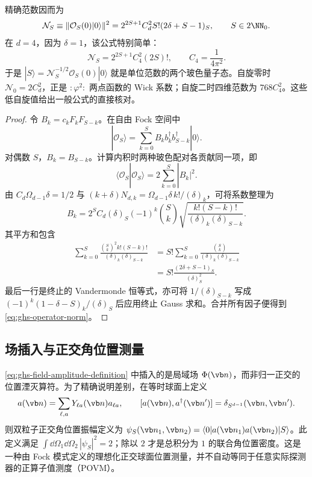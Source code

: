 \begin{proposition}
精确范数因而为
\begin{equation}\label{eq:ghs-operator-norm}
 \mathcal N_S\equiv\|\mathcal O_S(0)|0\rangle\|^2
 =2^{2S+1} C_d^2 S!(2\delta+S-1)_S,
 \qquad S\in2\NN_0.
\end{equation}
在 $d=4$，因为 $\delta=1$，该公式特别简单：
\begin{equation}\label{eq:ghs-norm-four-d}
 \mathcal N_S=2^{2S+1}C_4^2(2S)!,\qquad
 C_4=\frac1{4\pi^2}.
\end{equation}
于是 $|S\rangle=\mathcal N_S^{-1/2}\mathcal O_S(0)|0\rangle$ 就是单位范数的两个玻色量子态。自旋零时 $\mathcal N_0=2C_d^2$，正是 $:\!\varphi^2\!:$ 两点函数的 Wick 系数；自旋二时四维范数为 $768C_4^2$。这些低自旋值给出一般公式的直接核对。
\end{proposition}
\begin{proof}
令 $B_k=c_kF_kF_{S-k}$。在自由 Fock 空间中
\begin{equation*}
|\mathcal O_S\rangle=\sum_{k=0}^S B_k b_k^\dagger b_{S-k}^\dagger|0\rangle.
\end{equation*}
对偶数 $S$，$B_k=B_{S-k}$。计算内积时两种玻色配对各贡献同一项，即
\begin{equation*}
\langle\mathcal O_S|\mathcal O_S\rangle=2\sum_{k=0}^S|B_k|^2.
\end{equation*}
由 $C_d\Omega_{d-1}\delta=1/2$ 与 $(k+\delta)N_{d,k}=\Omega_{d-1}\delta\,k!/(\delta)_k$，可将系数整理为
\begin{equation*}
B_k=2^S C_d(\delta)_S(-1)^k\binom Sk
\sqrt{\frac{k!(S-k)!}{(\delta)_k(\delta)_{S-k}}}.
\end{equation*}
其平方和包含
\begin{align*}
\sum_{k=0}^S\frac{\binom Sk^2 k!(S-k)!}{(\delta)_k(\delta)_{S-k}}
&=S!\sum_{k=0}^S\frac{\binom Sk}{(\delta)_k(\delta)_{S-k}}\\
&=S!\frac{(2\delta+S-1)_S}{(\delta)_S^2}.
\end{align*}
最后一行是终止的 Vandermonde 恒等式，亦可将 $1/(\delta)_{S-k}$ 写成 $(-1)^k(1-\delta-S)_k/(\delta)_S$ 后应用终止 Gauss 求和。合并所有因子便得到 \cref{eq:ghs-operator-norm}。
\end{proof}



\subsection{场插入与正交角位置测量}

\cref{eq:ghs-field-amplitude-definition} 中插入的是局域场 $\Phi(\vb n)$，而非归一正交的位置湮灭算符。为了精确说明差别，在等时球面上定义
\begin{equation}\label{eq:ghs-position-annihilator}
 a(\vb n)=\sum_{\ell,a}Y_{\ell a}(\vb n)a_{\ell a},\qquad
 [a(\vb n),a^\dagger(\vb n')]=\delta_{S^{d-1}}(\vb n,\vb n').
\end{equation}
则双粒子正交角位置振幅定义为 $\psi_S(\vb n_1,\vb n_2)=\langle0|a(\vb n_1)a(\vb n_2)|S\rangle$。此定义满足 $\int\dd\Omega_1\dd\Omega_2\,|\psi_S|^2=2$；除以 $2$ 才是总积分为 $1$ 的联合角位置密度。这是一种由 Fock 模式定义的理想化正交球面位置测量，并不自动等同于任意实际探测器的正算子值测度（POVM）。

